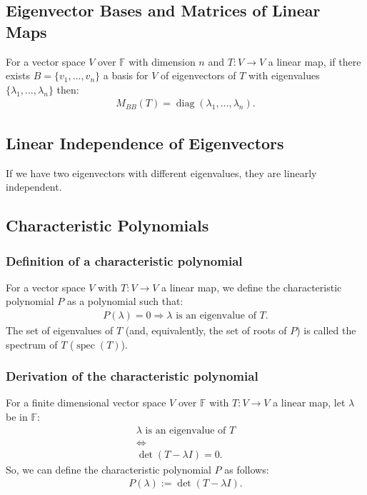\documentclass[a4paper, 12pt, twoside]{article}
\DeclareMathOperator{\Diag}{diag}
\DeclareMathOperator{\Spec}{spec}
\begin{document}
\subsection{Eigenvector Bases and Matrices of Linear Maps}

For a vector space $V$ over $\mathbb{F}$ with dimension $n$ and 
$T : V \to V$ a linear map, if there exists 
$B = \{v_1, \ldots, v_n\}$ a basis for $V$ of eigenvectors of $T$
with eigenvalues $\{\lambda_1, \ldots, \lambda_n\}$ then:
\begin{align*}
  M_{BB}(T) = \Diag(\lambda_1, \ldots, \lambda_n).
\end{align*}

\subsection{Linear Independence of Eigenvectors}

If we have two eigenvectors with different eigenvalues, they are
linearly independent.

\subsection{Characteristic Polynomials}

\subsubsection{Definition of a characteristic polynomial}

For a vector space $V$ with $T:V \to V$ a linear map, we define
the characteristic polynomial $P$ as a polynomial such that:
\begin{align*}
  P(\lambda) = 0 \Rightarrow \lambda \text{ is an eigenvalue of } T.
\end{align*}
The set of eigenvalues of $T$ (and, equivalently, the set of roots 
of $P$) is called the spectrum of $T$ ($\Spec(T)$).

\subsubsection{Derivation of the characteristic polynomial}

For a finite dimensional vector space $V$ over $\mathbb{F}$ 
with $T:V \to V$ a linear map, let $\lambda$ be in $\mathbb{F}$:
\begin{gather*}
  \lambda \text{ is an eigenvalue of } T \\
  \Longleftrightarrow \\
  \det(T - \lambda I) = 0.
\end{gather*}
So, we can define the characteristic polynomial $P$ as follows:
\begin{gather*}
  P(\lambda) := \det(T - \lambda I).
\end{gather*}
\end{document}
